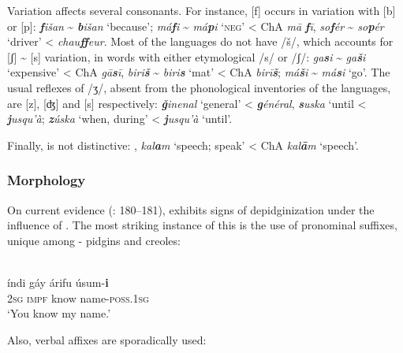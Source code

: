 \documentclass[output=paper]{langsci/langscibook}
\begin{document}
   Variation affects several consonants. For instance, [f] occurs in variation with [b] or [p]:  \textit{\textbf{f}išan} {\textasciitilde} \textit{\textbf{b}išan} ‘because’;   \textit{má}\textit{\textbf{f}i} {\textasciitilde} \textit{má}\textit{\textbf{p}i} ‘\textsc{neg}’ < ChA \textit{mā} \textit{\textbf{f}ī}, \textit{so}\textit{\textbf{f}ér} {\textasciitilde} \textit{so}\textit{\textbf{p}ér} ‘driver’ <  \textit{chau}\textit{\textbf{ff}eur}. Most of the  languages do not have /š/, which accounts for [ʃ] {\textasciitilde} [s] variation, in words with either etymological /s/ or /ʃ/:  \textit{ga\textbf{s}i} {\textasciitilde} \textit{ga\textbf{š}i} ‘expensive’ < ChA \textit{gā\textbf{s}ī}, \textit{biri\textbf{š}} {\textasciitilde} \textit{biri\textbf{s}} ‘mat’ < ChA \textit{birī\textbf{š}};   \textit{má\textbf{š}i} {\textasciitilde} \textit{má\textbf{s}i} ‘go’. The usual reflexes of  /ʒ/, absent from the phonological inventories of the  languages, are [z], [ʤ] and [s] respectively:  \textit{\textbf{ǧ}inenal} ‘general’ <  \textit{\textbf{g}énéral}, \textit{\textbf{s}uska} ‘until <  \textit{\textbf{j}usqu’à};   \textit{\textbf{z}úska} `when, during' <  \textit{\textbf{j}usqu’à} `until'.

Finally,  is not distinctive: ,   \textit{kal\textbf{a}m} ‘speech; speak’ < ChA \textit{kal\textbf{ā}m} ‘speech’.


 \subsubsection{Morphology}

On current evidence (\citealt{Luffin2013}: 180–181),   exhibits signs of depidginization under the influence of  . The most striking instance of this is the use of pronominal suffixes, unique among - pidgins and creoles:

\ea
{  \citep[180]{Luffin2013}}\\
\gll    índi gáy árifu úsum-\textbf{i} \\
        2\textsc{sg} \textsc{impf} know name-\textsc{poss}.1\textsc{sg}\\
\glt    `You know my name.'
\z
 
\noindent Also, verbal affixes are sporadically used:
\end{document}

